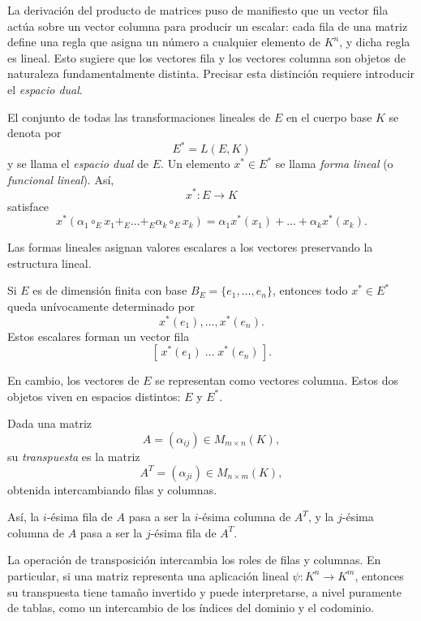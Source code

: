 \medskip


La derivación del producto de matrices puso de manifiesto que un vector fila actúa sobre un vector columna para producir un escalar: cada fila de una matriz define una regla que asigna un número a cualquier elemento de $K^n$, y dicha regla es lineal. Esto sugiere que los vectores fila y los vectores columna son objetos de naturaleza fundamentalmente distinta. Precisar esta distinción requiere introducir el \emph{espacio dual}.

\medskip

El conjunto de todas las transformaciones lineales de $E$ en el cuerpo base $K$ se denota por
\[
E^* = L(E,K)
\]
y se llama el \emph{espacio dual} de $E$. Un elemento $x^* \in E^*$ se llama \emph{forma lineal} (o \emph{funcional lineal}). Así,
\[
x^* : E \to K
\]
satisface
\[
x^*(\alpha_1 \circ_E x_1 +_E \dots +_E \alpha_k \circ_E x_k)
=
\alpha_1 x^*(x_1) + \dots + \alpha_k x^*(x_k).
\]

Las formas lineales asignan valores escalares a los vectores preservando la estructura lineal.

\medskip

Si $E$ es de dimensión finita con base $B_E=\{e_1,\dots,e_n\}$, entonces todo $x^*\in E^*$ queda unívocamente determinado por
\[
x^*(e_1),\dots,x^*(e_n).
\]
Estos escalares forman un vector fila
\[
[\,x^*(e_1)\;\dots\;x^*(e_n)\,].
\]

En cambio, los vectores de $E$ se representan como vectores columna. Estos dos objetos viven en espacios distintos: $E$ y $E^*$.

\medskip

Dada una matriz
\[
A = (\alpha_{ij}) \in M_{m \times n}(K),
\]
su \emph{transpuesta} es la matriz
\[
A^T = (\alpha_{ji}) \in M_{n \times m}(K),
\]
obtenida intercambiando filas y columnas.

\medskip

Así, la $i$-ésima fila de $A$ pasa a ser la $i$-ésima columna de $A^T$,
y la $j$-ésima columna de $A$ pasa a ser la $j$-ésima fila de $A^T$.

\medskip

La operación de transposición intercambia los roles de filas y columnas.
En particular, si una matriz representa una aplicación lineal
\( \psi : K^n \to K^m \),
entonces su transpuesta tiene tamaño invertido y puede interpretarse,
a nivel puramente de tablas, como un intercambio de los índices del dominio y el codominio.

